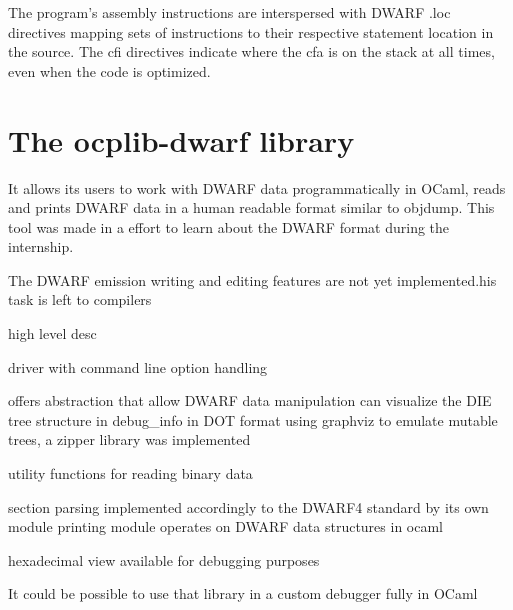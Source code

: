 The program's assembly instructions are interspersed with DWARF .loc directives mapping sets of
instructions to their respective statement location in the source.
The \gls{cfi} directives indicate where the \gls{cfa} is on the stack at all times, even when the code is optimized.






\section{The ocplib-dwarf library}


It allows its users to work with DWARF data programmatically in OCaml,
reads and prints DWARF data in a human readable format similar to objdump.
This tool was made in a effort to learn about the DWARF format during the internship.

The DWARF emission writing and editing features are not yet implemented.his task is left to compilers

high level desc


driver with command line option handling

offers abstraction that allow DWARF data manipulation
can visualize the DIE tree structure in debug\_info in DOT format using graphviz
to emulate mutable trees, a zipper library was implemented

utility functions for reading binary data

section parsing implemented accordingly to the DWARF4 standard by its own module
printing module operates on DWARF data structures in ocaml

hexadecimal view available for debugging purposes

It could be possible to use that library in a custom debugger fully in OCaml
